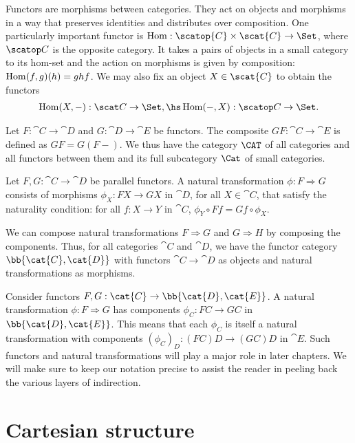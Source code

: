 Functors are morphisms between categories. They act on objects and morphisms in
a way that preserves identities and distributes over composition. One
particularly important functor is $\Hom : \scatop{C}\times\scat{C}\to\Set$,
where $\scatop C$ is the opposite category. It takes a pairs of objects in a small
category to its hom-set and the action on morphisms is given by composition:
$\operatorname{Hom}(f,g)(h) = ghf$. We may also fix an object $X\in\scat{C}$ to obtain the
functors
\begin{align*}
  \Hom(X,-):\scat C\to\Set, \hs \Hom(-,X):\scatop C\to\Set.
\end{align*}

Let $F:\cat{C}\to\cat{D}$ and $G:\cat{D}\to\cat{E}$ be functors. The composite
$GF:\cat{C}\to\cat{E}$ is defined as $GF = G(F-)$. We thus have the category
$\CAT$ of all categories and all functors between them and its full subcategory
$\Cat$ of small categories.

Let $F,G:\cat{C}\to\cat{D}$ be parallel functors. A natural transformation $\phi
: F \Rightarrow G$ consists of morphisms $\phi_X : FX \to GX$ in $\cat{D}$, for
all $X\in\cat{C}$, that satisfy the naturality condition: for all $f:X\to Y$ in
$\cat{C}$, $\phi_Y\circ Ff = Gf\circ \phi_X$.

We can compose natural transformations $F\Rightarrow G$ and $G\Rightarrow H$ by
composing the components. Thus, for all categories $\cat{C}$ and $\cat{D}$, we
have the functor category $\bb{\cat{C},\cat{D}}$ with functors
$\cat{C}\to\cat{D}$ as objects and natural transformations as morphisms.

Consider functors $F,G:\cat{C}\to\bb{\cat{D},\cat{E}}$. A natural
transformation $\phi : F\Rightarrow G$ has components $\phi_C : FC\to GC$ in
$\bb{\cat{D},\cat{E}}$. This means that each $\phi_C$ is itself a natural
transformation with components $(\phi_C)_D : (FC)D \to (GC)D$ in
$\cat{E}$. Such functors and natural transformations will play a major role in
later chapters. We will make sure to keep our notation precise to assist the
reader in peeling back the various layers of indirection.

\section{Cartesian structure}\label{sec:cartesian_categories}

